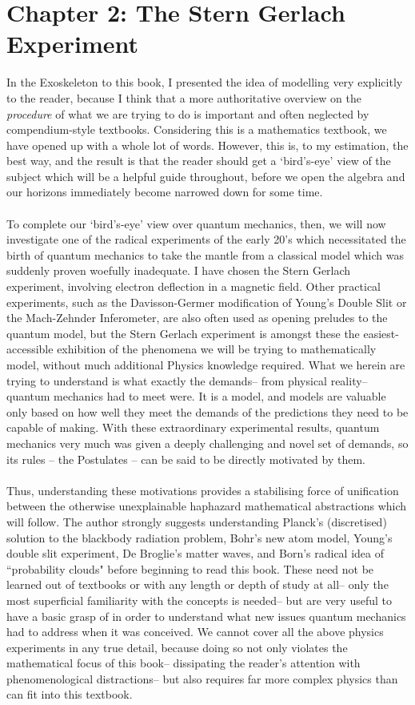 \chapter{Chapter 2: The Stern Gerlach Experiment}
In the Exoskeleton to this book, I presented the idea of modelling very explicitly to the reader, because I think that a more authoritative overview on the \emph{procedure} of what we are trying to do is important and often neglected by compendium-style textbooks. Considering this is a mathematics textbook, we have opened up with a whole lot of words. However, this is, to my estimation, the best way, and the result is that the reader should get a `bird's-eye' view of the subject which will be a helpful guide throughout, before we open the algebra and our horizons immediately become narrowed down for some time.
\\\\
To complete our `bird's-eye' view over quantum mechanics, then, we will now investigate one of the radical experiments of the early 20's which necessitated the birth of quantum mechanics to take the mantle from a classical model which was suddenly proven woefully inadequate. I have chosen the Stern Gerlach experiment, involving electron deflection in a magnetic field. Other practical experiments, such as the Davisson-Germer modification of Young's Double Slit or the Mach-Zehnder Inferometer, are also often used as opening preludes to the quantum model, but the Stern Gerlach experiment is amongst these the easiest-accessible exhibition of the phenomena we will be trying to mathematically model, without much additional Physics knowledge required. What we herein are trying to understand is what exactly the demands-- from physical reality-- quantum mechanics had to meet were. It is a model, and models are valuable only based on how well they meet the demands of the predictions they need to be capable of making. With these extraordinary experimental results, quantum mechanics very much was given a deeply challenging and novel set of demands, so its rules -- the Postulates -- can be said to be directly motivated by them.
\\\\
Thus, understanding these motivations provides a stabilising force of unification between the otherwise unexplainable haphazard mathematical abstractions which will follow. The author strongly suggests understanding Planck's (discretised) solution to the blackbody radiation problem, Bohr's new atom model, Young's double slit experiment, De Broglie's matter waves, and Born's radical idea of ``probability clouds" before beginning to read this book. These need not be learned out of textbooks or with any length or depth of study at all-- only the most superficial familiarity with the concepts is needed-- but are very useful to have a basic grasp of in order to understand what new issues quantum mechanics had to address when it was conceived. We cannot cover all the above physics experiments in any true detail, because doing so not only violates the mathematical focus of this book-- dissipating the reader's attention with phenomenological distractions-- but also requires far more complex physics than can fit into this textbook. 
